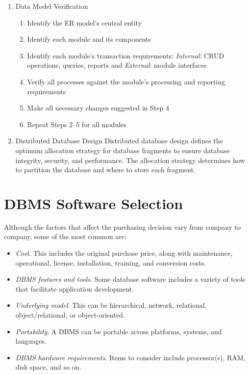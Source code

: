 \documentclass[a4paper, 12pt, titlepage]{report}
\begin{document}
\begin{enumerate}
\item Data Model Verification
\begin{enumerate}
\item Identify the ER model’s central entity
\item Identify each module and its components
\item Identify each module’s transaction requirements:
\emph{Internal}: CRUD operations, queries, reports and \emph{External}: module interfaces
\item Verify all processes against the module’s processing and reporting requirements
\item Make all necessary changes suggested in Step 4
\item Repeat Steps 2–5 for all modules
\end{enumerate}
\item Distributed Database Design
Distributed database design defines the optimum allocation strategy for database fragments to ensure database integrity, security, and performance. The allocation strategy determines how to partition the database and where to store each fragment.
\end{enumerate}
\section{DBMS Software Selection}
Although the factors that affect the purchasing decision vary from company to company, some of the most common are:
\begin{itemize}
\item \emph{Cost}. This includes the original purchase price, along with maintenance, operational, license, installation, training, and conversion costs.
\item \emph{DBMS features and tools}. Some database software includes a variety of tools that facilitate application development.
\item \emph{Underlying model}. This can be hierarchical, network, relational, object/relational, or object-oriented.
\item \emph{Portability}. A DBMS can be portable across platforms, systems, and languages.
\item \emph{DBMS hardware requirements}. Items to consider include processor(s), RAM, disk space, and so on.
\end{itemize}
\end{document}
